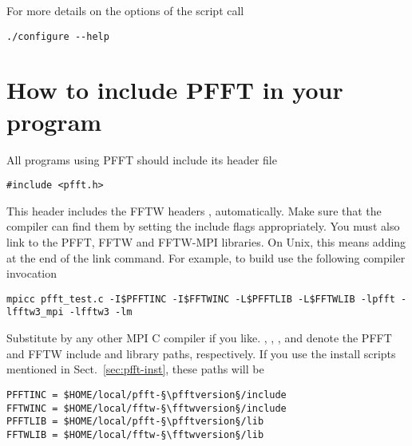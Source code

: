 For more details on the options of the  script call
\begin{lstlisting}
./configure --help
\end{lstlisting}


\section{How to include PFFT in your program}
All programs using PFFT should include its header file
\begin{lstlisting}
#include <pfft.h>
\end{lstlisting}
This header includes the FFTW headers ,  automatically. Make sure that the compiler can find them by setting
the include flags appropriately.
You must also link to the PFFT, FFTW and FFTW-MPI libraries. On Unix, this means adding  at the end of the link command.
For example, to build  use the following compiler invocation
\begin{lstlisting}[prebreak = {\textbackslash}]
mpicc pfft_test.c -I$PFFTINC -I$FFTWINC -L$PFFTLIB -L$FFTWLIB -lpfft -lfftw3_mpi -lfftw3 -lm
\end{lstlisting}
Substitute  by any other MPI C compiler if you like.
, , , and  denote the PFFT and FFTW include and library paths, respectively.
If you use the install scripts mentioned in Sect.~\ref{sec:pfft-inst}, these paths will be
\begin{lstlisting}[escapechar=§,numbers=none]
PFFTINC = $HOME/local/pfft-§\pfftversion§/include
FFTWINC = $HOME/local/fftw-§\fftwversion§/include
PFFTLIB = $HOME/local/pfft-§\pfftversion§/lib
FFTWLIB = $HOME/local/fftw-§\fftwversion§/lib
\end{lstlisting}



